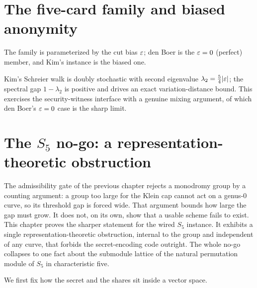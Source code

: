 \chapter{The five-card family and biased anonymity}

\begin{definition}
  \label{def:five_card_family}
  \rocqok
  The family is parameterized by the cut bias $\varepsilon$; den Boer is the $\varepsilon=0$
  (perfect) member, and Kim's instance is the biased one.
\end{definition}

\begin{theorem}
  \label{thm:kim_mixing}
  \rocqok
  Kim's Schreier walk is doubly stochastic with second eigenvalue
  $\lambda_2=\tfrac54|\varepsilon|$; the spectral gap $1-\lambda_2$ is positive and
  drives an exact variation-distance bound. This exercises the security-witness
  interface with a genuine mixing argument, of which den Boer's $\varepsilon=0$ case is
  the sharp limit.
\end{theorem}

\chapter{The $S_5$ no-go: a representation-theoretic obstruction}

The admissibility gate of the previous chapter rejects a monodromy group by a
counting argument: a group too large for the Klein cap cannot act on a genus-0
curve, so its threshold gap is forced wide. That argument bounds how large the
gap must grow. It does not, on its own, show that a usable scheme fails to exist.
This chapter proves the sharper statement for the wired $S_5$ instance. It
exhibits a single representation-theoretic obstruction, internal to the group and
independent of any curve, that forbids the secret-encoding code outright. The
whole no-go collapses to one fact about the submodule lattice of the natural
permutation module of $S_5$ in characteristic five.

We first fix how the secret and the shares sit inside a vector space.

